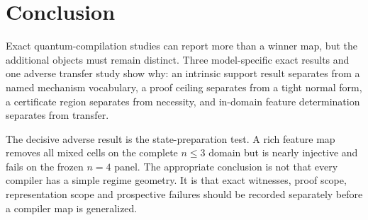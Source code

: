 \section{Conclusion}

Exact quantum-compilation studies can report more than a winner map, but the additional objects must remain distinct.  Three model-specific exact results and one adverse transfer study show why: an intrinsic support result separates from a named mechanism vocabulary, a proof ceiling separates from a tight normal form, a certificate region separates from necessity, and in-domain feature determination separates from transfer.

The decisive adverse result is the state-preparation test.  A rich feature map removes all mixed cells on the complete $n\leq3$ domain but is nearly injective and fails on the frozen $n=4$ panel.  The appropriate conclusion is not that every compiler has a simple regime geometry.  It is that exact witnesses, proof scope, representation scope and prospective failures should be recorded separately before a compiler map is generalized.

